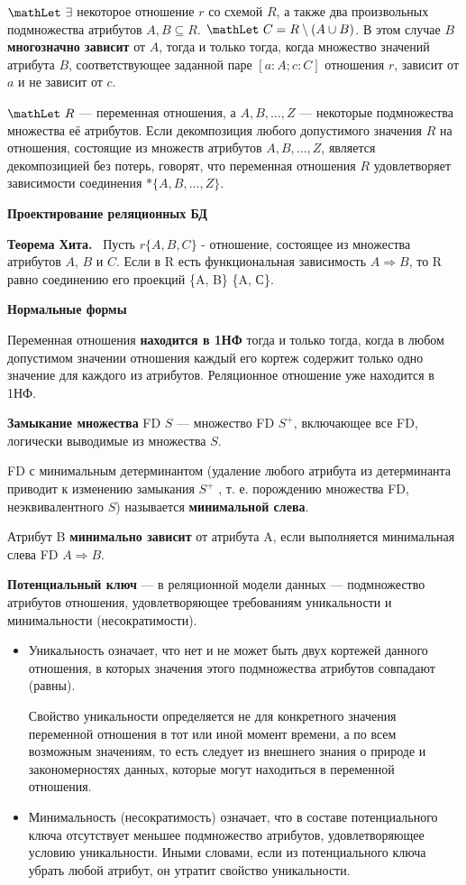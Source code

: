 $\mathLet  ~ \exists$ некоторое отношение $r$ со схемой $R$, а также два произвольных подмножества атрибутов $A,B\subseteq R$. 
$\mathLet ~ C = R \setminus (A\cup B)$.
В этом случае $B$ \textbf{многозначно зависит} от $A$, тогда и только тогда, когда множество значений атрибута $B$, соответствующее заданной паре $[a:A;c:C]$ отношения $r$, зависит от $a$ и не зависит от $c$.

$\mathLet ~ R$ --- переменная отношения, а $A, B, \dots, Z$ --- некоторые подмножества множества её атрибутов.
Если декомпозиция любого допустимого значения $R$ на отношения, состоящие из множеств атрибутов $A, B, \dots, Z$, является декомпозицией без потерь, говорят, что переменная отношения $R$ удовлетворяет зависимости соединения $\ast\{A, B, \dots, Z\}$.

\textbf{Проектирование реляционных БД}

\textbf{Теорема Хита.} 
\mathLet \ Пусть $r \{A, B, C\}$ - отношение, состоящее из множества атрибутов $A$, $B$ и $C$. Если в R есть функциональная зависимость $A \Rightarrow B$, то R равно соединению его проекций \{A, B\} \{A, С\}.


\textbf{Нормальные формы}

Переменная отношения \textbf{находится в 1НФ} тогда и только тогда, когда в любом допустимом значении отношения каждый его кортеж содержит только одно значение для каждого из атрибутов. 
Реляционное отношение уже находится в 1НФ.

\textbf{Замыкание множества} FD $S$ --- множество FD $S^+$, включающее все FD, логически выводимые из множества $S$.

FD с минимальным детерминантом (удаление любого атрибута из детерминанта приводит к изменению замыкания $S^+$ , т. е. порождению множества FD, неэквивалентного $S$) называется \textbf{минимальной слева}. 

Атрибут B \textbf{минимально зависит} от атрибута A, если выполняется минимальная слева FD $A \Rightarrow B$.

\textbf{Потенциальный ключ} --- в реляционной модели данных --- подмножество атрибутов отношения, удовлетворяющее требованиям уникальности и минимальности (несократимости).
\begin{itemize}
    \item Уникальность означает, что нет и не может быть двух кортежей данного отношения, в которых значения этого подмножества атрибутов совпадают (равны).
    
    Свойство уникальности определяется не для конкретного значения переменной отношения в тот или иной момент времени, а по всем возможным значениям, то есть следует из внешнего знания о природе и закономерностях данных, которые могут находиться в переменной отношения.
    \item Минимальность (несократимость) означает, что в составе потенциального ключа отсутствует меньшее подмножество атрибутов, удовлетворяющее условию уникальности.
    Иными словами, если из потенциального ключа убрать любой атрибут, он утратит свойство уникальности.
\end{itemize}

